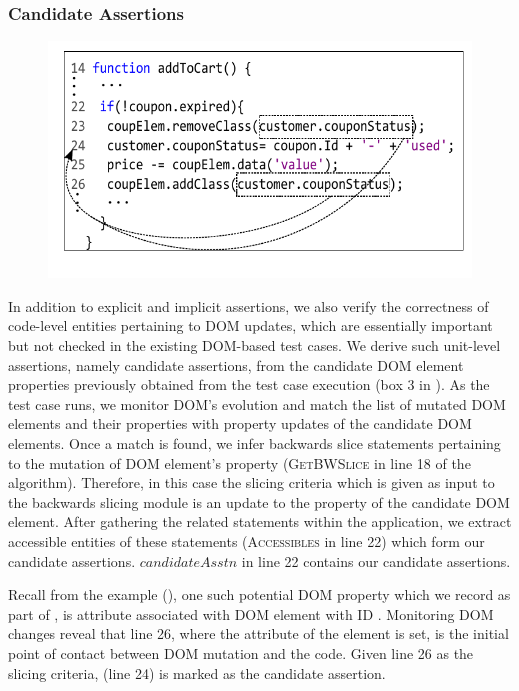 \subsubsection{Candidate Assertions} \label{Sec:candidateAssertions}
\begin{figure}[!t]
  \centering
  \includegraphics[width=.9\hsize]{fig/candidateDOMToCode}
  \vspace{-0.1in} 
  \label{Fig:candidateDOMToCode}
  \vspace{-0.1in} 
\end{figure}
In addition to explicit and implicit assertions, we also verify the correctness of code-level entities pertaining to DOM updates, which are essentially important but not checked in the existing DOM-based test cases. We derive such unit-level assertions, namely candidate assertions, from the candidate DOM element properties previously obtained from the test case execution (box 3 in ). As the test case runs, we monitor DOM's evolution and match the list of mutated DOM elements and their properties with property updates of the candidate DOM elements. Once a match is found, we infer backwards slice statements pertaining to the mutation of DOM element's property (\textsc{GetBWSlice} in line 18 of the algorithm). Therefore, in this case the slicing criteria which is given as input to the backwards slicing module is an update to the property of the candidate DOM element.
After gathering the related \javascript statements within the application, we extract accessible entities of these statements (\textsc{Accessibles} in line 22) which form our candidate assertions. $candidateAsstn$ in line 22 contains our candidate assertions. 

Recall from the example (), one such potential DOM property which we record as part of , is  attribute associated with DOM element with ID . Monitoring DOM changes reveal that line 26, where the  attribute of the element is set, is the initial point of contact between DOM mutation and the \javascript code. Given line 26 as the slicing criteria,  (line 24) is marked as the candidate assertion.